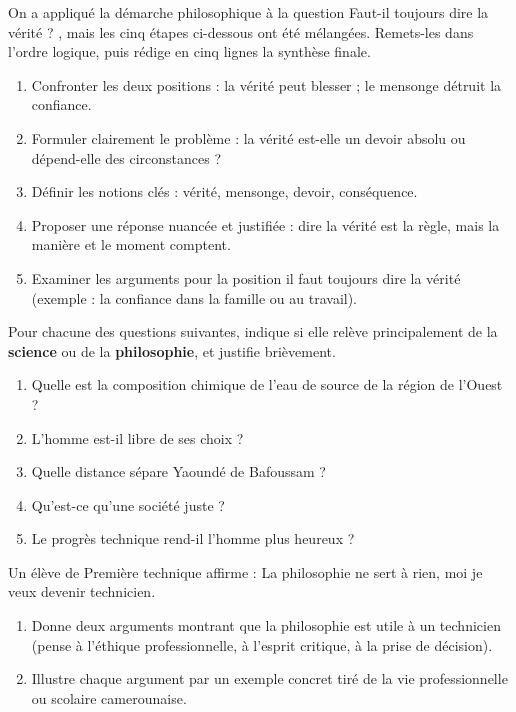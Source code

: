 \documentclass[11pt]{article}
\begin{document}
\begin{exercice}
On a appliqué la démarche philosophique à la question \og Faut-il toujours dire la vérité ? \fg{}, mais les cinq étapes ci-dessous ont été mélangées. Remets-les dans l'ordre logique, puis rédige en cinq lignes la synthèse finale.
\begin{enumerate}
\item[\textbf{a.}] Confronter les deux positions : la vérité peut blesser ; le mensonge détruit la confiance.
\item[\textbf{b.}] Formuler clairement le problème : la vérité est-elle un devoir absolu ou dépend-elle des circonstances ?
\item[\textbf{c.}] Définir les notions clés : vérité, mensonge, devoir, conséquence.
\item[\textbf{d.}] Proposer une réponse nuancée et justifiée : dire la vérité est la règle, mais la manière et le moment comptent.
\item[\textbf{e.}] Examiner les arguments pour la position \og il faut toujours dire la vérité \fg{} (exemple : la confiance dans la famille ou au travail).
\end{enumerate}
\end{exercice}

\begin{exercice}
Pour chacune des questions suivantes, indique si elle relève principalement de la \textbf{science} ou de la \textbf{philosophie}, et justifie brièvement.
\begin{enumerate}
\item Quelle est la composition chimique de l'eau de source de la région de l'Ouest ?
\item L'homme est-il libre de ses choix ?
\item Quelle distance sépare Yaoundé de Bafoussam ?
\item Qu'est-ce qu'une société juste ?
\item Le progrès technique rend-il l'homme plus heureux ?
\end{enumerate}
\end{exercice}

\begin{exercice}
Un élève de Première technique affirme : \og La philosophie ne sert à rien, moi je veux devenir technicien. \fg{}
\begin{enumerate}
\item Donne deux arguments montrant que la philosophie est utile à un technicien (pense à l'éthique professionnelle, à l'esprit critique, à la prise de décision).
\item Illustre chaque argument par un exemple concret tiré de la vie professionnelle ou scolaire camerounaise.
\end{enumerate}
\end{exercice}
\end{document}
